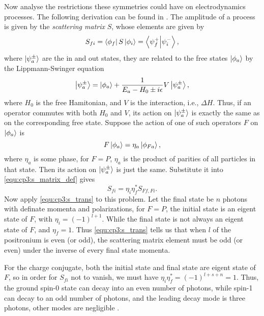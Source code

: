 \begin{problembody}
    Now analyse the restrictions these symmetries could have on electrodynamics processes. The following derivation
    can be found in \cite{WeinBergQFT}. The amplitude of a process is given by the \textit{scattering matrix} $S$,
    whose elements are given by
    \begin{equation}\label{equ:cp3:s_matrix_def}
        S_{fi} = \left\langle \phi_f\right|S\left|\phi_i\right\rangle = \left\langle \psi^+_f \middle| \psi^-_i \right\rangle,
    \end{equation}
    where $\left|\psi^\pm_a\right\rangle$ are the in and out states, they are related to the free states $\left|\phi_a\right\rangle$ by
    the Lippmann-Swinger equation
    \begin{equation*}
        \left|\psi^\pm_a\right\rangle = \left|\phi_a\right\rangle 
        + \frac{1}{E_a - H_0 \pm i\epsilon} V \left|\psi^\pm_a\right\rangle,
    \end{equation*}
    where $H_0$ is the free Hamitonian, and $V$ is the interaction, i.e., $\Delta H$. Thus, if an operator commutes
    with both $H_0$ and $V$, its action on $\left|\psi^\pm_a\right\rangle$ is exactly the same as on the corresponding free state.
    Suppose the action of one of such operators $F$ on $\left|\phi_a\right\rangle$ is
    \begin{equation*}
        F\left|\phi_a\right\rangle = \eta_a\left|\phi_{Fa}\right\rangle,
    \end{equation*}
    where $\eta_a$ is some phase, for $F = P$, $\eta_a$ is the product of parities of all particles in that state. Then 
    its action on $\left|\psi^\pm_a\right\rangle$ is just the same. Substitute it into \eqref{equ:cp3:s_matrix_def} gives
    \begin{equation}\label{equ:cp3:s_trans}
        S_{fi} = \eta_i \eta_f^\ast S_{Ff, Fi}.
    \end{equation}
    Now apply \eqref{equ:cp3:s_trans} to this problem. Let the final state be $n$ photons with definate momenta and polarizations,
    for $F = P$, the initial state is an eigent state of $F$, with $\eta_i = (-1)^{l + 1}$. While the final state is not 
    always an eigent state of $F$, and $\eta_f = 1$. Thus \eqref{equ:cp3:s_trans} tells us that when $l$ of the positronium is
    even (or odd), the scattering matrix element must be odd (or even) under the inverse of every final state momenta. 

    For the charge conjugate, both the initial state and final state are eigent state of $F$, so in order for $S_{fi}$ not to vanish,
    we must have $\eta_i \eta_f^\ast = (-1)^{l + s + n} = 1$. Thus, the ground spin-0 state can decay into an even number of photons, 
    while spin-1 can decay to an odd number of photons, and the leading decay mode is three photons, other modes are negligible \cite{DecaysOfPositronium}.
\end{problembody}